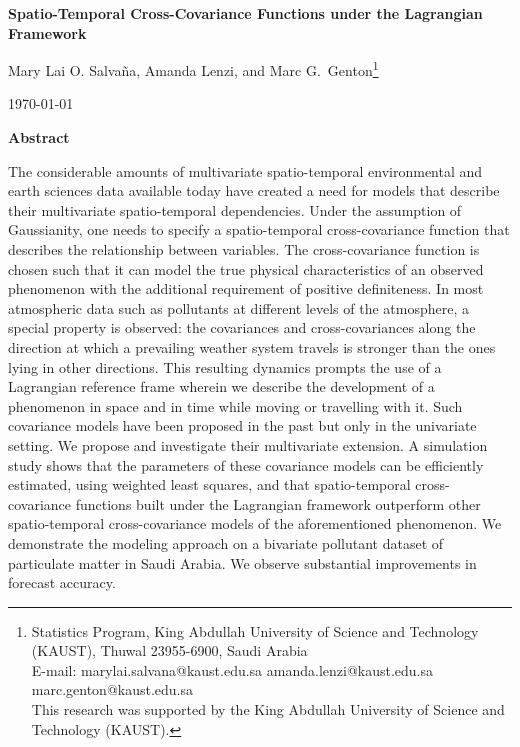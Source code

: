 \documentclass[12pt]{article}
\newcommand{\0}{\mathbf{0}}
\begin{document}
\thispagestyle{empty} \baselineskip=28pt \vskip 5mm
\begin{center} {\LARGE{\bf Spatio-Temporal Cross-Covariance Functions under the Lagrangian Framework}}
	
\end{center}

\baselineskip=12pt \vskip 10mm

\begin{center}\large
Mary Lai O. Salva\~{n}a, Amanda Lenzi, and Marc G.~Genton\footnote[1]{\baselineskip=10pt Statistics Program, King Abdullah University of Science and Technology (KAUST), Thuwal 23955-6900, Saudi Arabia\\
E-mail: marylai.salvana@kaust.edu.sa amanda.lenzi@kaust.edu.sa marc.genton@kaust.edu.sa\\
This research was supported by the King Abdullah University of Science and Technology (KAUST).}
\end{center}

\baselineskip=17pt \vskip 10mm \centerline{\today} \vskip 15mm

\begin{center}
{\large{\bf Abstract}}
\end{center} 
The considerable amounts of multivariate spatio-temporal environmental and earth sciences data available today have created a need for models that describe their multivariate spatio-temporal dependencies. Under the assumption of Gaussianity, one needs to specify a spatio-temporal cross-covariance function that describes the relationship between variables. The cross-covariance function is chosen such that it can model the true physical characteristics of an observed phenomenon with the additional requirement of positive definiteness. In most atmospheric data such as pollutants at different levels of the atmosphere, a special property is observed: the covariances and cross-covariances along the direction at which a prevailing weather system travels is stronger than the ones lying in other directions. This resulting dynamics prompts the use of a Lagrangian reference frame wherein we describe the development of a phenomenon in space and in time while moving or travelling with it. Such covariance models have been proposed in the past but only in the univariate setting. We propose and investigate their multivariate extension. A simulation study shows that the parameters of these covariance models can be efficiently estimated, using weighted least squares, and that spatio-temporal cross-covariance functions built under the Lagrangian framework outperform other spatio-temporal cross-covariance models of the aforementioned phenomenon. We demonstrate the modeling approach on a bivariate pollutant dataset of particulate matter in Saudi Arabia. We observe substantial improvements in forecast accuracy. 
\baselineskip=14pt
\end{document}
